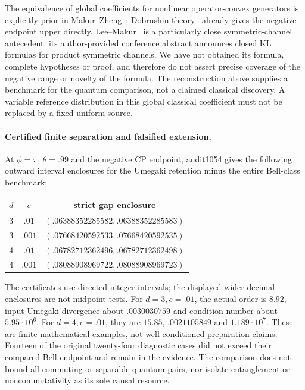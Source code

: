 The equivalence of global coefficients for nonlinear operator-convex generators is explicitly prior in Makur--Zheng~\cite[Proposition~6]{MZ}; Dobrushin theory~\cite{PW} already gives the negative-endpoint upper directly. Lee--Makur~\cite{LM} is a particularly close symmetric-channel antecedent: its author-provided conference abstract announces closed KL formulas for product symmetric channels. We have not obtained its formula, complete hypotheses or proof, and therefore do not assert precise coverage of the negative range or novelty of the formula. The reconstruction above supplies a benchmark for the quantum comparison, not a claimed classical discovery. A variable reference distribution in this global classical coefficient must not be replaced by a fixed uniform source.

\paragraph{Certified finite separation and falsified extension.}
At $\phi=\pi$, $\theta=.99$ and the negative CP endpoint, audit1054 gives the following outward interval enclosures for the Umegaki retention minus the entire Bell-class benchmark:
\begin{center}
\begin{tabular}{ccc}
\toprule
$d$&$e$&strict gap enclosure\\
\midrule
3&$.01$&$(.06388352285582,.06388352285583)$\\
3&$.001$&$(.07668420592533,.07668420592535)$\\
4&$.01$&$(.06782712362496,.06782712362498)$\\
4&$.001$&$(.08088908969722,.08088908969723)$\\
\bottomrule
\end{tabular}
\end{center}
The certificates use directed integer intervals; the displayed wider decimal enclosures are not midpoint tests. For $d=3,e=.01$, the actual order is $8.92$, input Umegaki divergence about $.0030030759$ and condition number about $5.95\cdot10^6$. For $d=4,e=.01$, they are $15.85$, $.0021105849$ and $1.189\cdot10^7$. These are finite mathematical examples, not well-conditioned preparation claims. Fourteen of the original twenty-four diagnostic cases did not exceed their compared Bell endpoint and remain in the evidence. The comparison does not bound all commuting or separable quantum pairs, nor isolate entanglement or noncommutativity as its sole causal resource.

